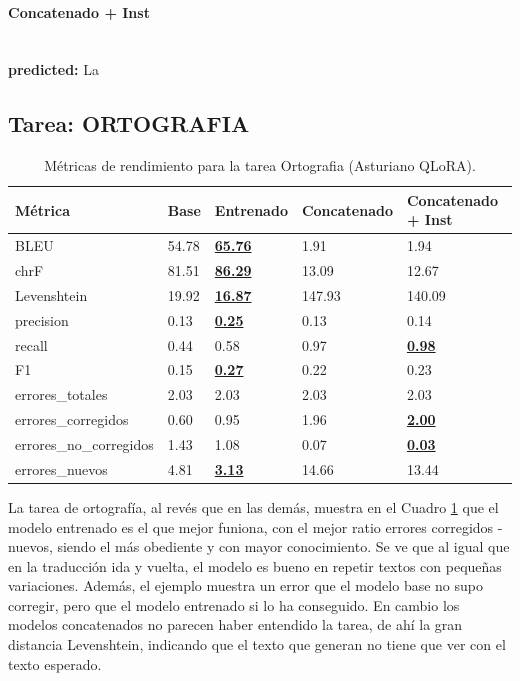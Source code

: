 \paragraph{Concatenado + Inst}~\\
\textbf{predicted:} La

\subsection{Tarea: ORTOGRAFIA}\label{tarea-ortografia}
\begin{longtable}[]{@{}lllll@{}}
\toprule\noalign{}
Métrica & Base & Entrenado & Concatenado & Concatenado + Inst \\
\midrule\noalign{}
\endhead
\bottomrule\noalign{}
\caption{Métricas de rendimiento para la tarea Ortografia (Asturiano QLoRA).}
\label{tab:metricas_ortografia_Asturiano QLoRA}
\endlastfoot
BLEU & 54.78 & \textbf{\underline{65.76}} & 1.91 & 1.94 \\
chrF & 81.51 & \textbf{\underline{86.29}} & 13.09 & 12.67 \\
Levenshtein & 19.92 & \textbf{\underline{16.87}} & 147.93 & 140.09 \\
precision & 0.13 & \textbf{\underline{0.25}} & 0.13 & 0.14 \\
recall & 0.44 & 0.58 & 0.97 & \textbf{\underline{0.98}} \\
F1 & 0.15 & \textbf{\underline{0.27}} & 0.22 & 0.23 \\
errores\_totales & 2.03 & 2.03 & 2.03 & 2.03 \\
errores\_corregidos & 0.60 & 0.95 & 1.96 & \textbf{\underline{2.00}} \\
errores\_no\_corregidos & 1.43 & 1.08 & 0.07 & \textbf{\underline{0.03}} \\
errores\_nuevos & 4.81 & \textbf{\underline{3.13}} & 14.66 & 13.44 \\
\end{longtable}

La tarea de ortografía, al revés que en las demás, muestra en el Cuadro \ref{tab:metricas_ortografia_Asturiano QLoRA} que el modelo entrenado es el que mejor funiona, con el mejor ratio errores corregidos - nuevos, siendo el más obediente y con mayor conocimiento. Se ve que al igual que en la traducción ida y vuelta, el modelo es bueno en repetir textos con pequeñas variaciones. Además, el ejemplo muestra un error que el modelo base no supo corregir, pero que el modelo entrenado si lo ha conseguido. En cambio los modelos concatenados no parecen haber entendido la tarea, de ahí la gran distancia Levenshtein, indicando que el texto que generan no tiene que ver con el texto esperado.

